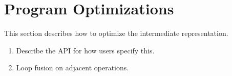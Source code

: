 \section{Program Optimizations}
This section describes how to optimize the intermediate representation.
\begin{enumerate}
    \item Describe the API for how users specify this.
    \item Loop fusion on adjacent operations.
\end{enumerate}